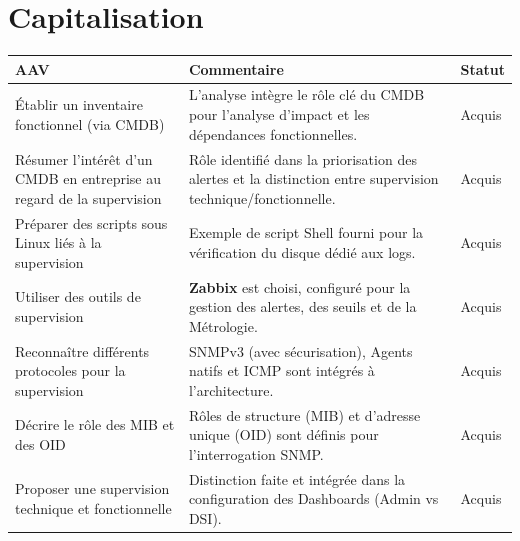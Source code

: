 \newpage

\section*{Capitalisation}

\begin{center}
\setlength{\tabcolsep}{10pt}
\begin{tabular}{|p{}|p{}|m{}|}
\hline
\textbf{AAV} & \textbf{Commentaire} & \textbf{Statut} \\ \hline

Établir un inventaire fonctionnel (via CMDB) &
L'analyse intègre le rôle clé du CMDB pour l'analyse d'impact et les dépendances fonctionnelles. &
{\color{green!60!black}Acquis} \\ \hline

Résumer l'intérêt d'un CMDB en entreprise au regard de la supervision &
Rôle identifié dans la priorisation des alertes et la distinction entre supervision technique/fonctionnelle. &
{\color{green!60!black}Acquis} \\ \hline

Préparer des scripts sous Linux liés à la supervision &
Exemple de script Shell fourni pour la vérification du disque dédié aux logs. &
{\color{green!60!black}Acquis} \\ \hline

Utiliser des outils de supervision &
\textbf{Zabbix} est choisi, configuré pour la gestion des alertes, des seuils et de la Métrologie. &
{\color{green!60!black}Acquis} \\ \hline

Reconnaître différents protocoles pour la supervision &
SNMPv3 (avec sécurisation), Agents natifs et ICMP sont intégrés à l'architecture. &
{\color{green!60!black}Acquis} \\ \hline

Décrire le rôle des MIB et des OID &
Rôles de structure (MIB) et d'adresse unique (OID) sont définis pour l'interrogation SNMP. &
{\color{green!60!black}Acquis} \\ \hline

Proposer une supervision technique et fonctionnelle &
Distinction faite et intégrée dans la configuration des Dashboards (Admin vs DSI). &
{\color{green!60!black}Acquis} \\ \hline
\end{tabular}
\end{center}

